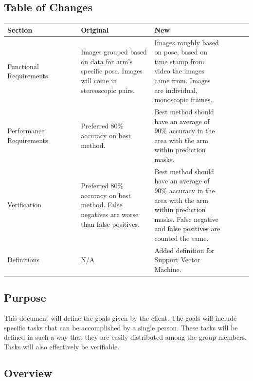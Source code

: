 \documentclass[10pt,journal,compsoc, draftclsnofoot,onecolumn]{IEEEtran}
\begin{document}
\subsection{Table of Changes}
\begin{center}
\begin{tabular}{|p{0.3\linewidth}|p{0.3\linewidth}|p{0.3\linewidth}|p{0.2\linewidth}|}
\hline
Section & Original & New \\ [0.5ex]
\hline\hline

Functional Requirements
&
Images grouped based on data for arm's specific pose.
Images will come in stereoscopic pairs.
&
Images roughly based on pose, based on time stamp from video the images came from.
Images are individual, monoscopic frames.
\\ \hline

Performance Requirements
&
Preferred 80\% accuracy on best method.
&
Best method should have an average of 90\% accuracy in the area with the arm within prediction masks.
\\ \hline

Verification
&
Preferred 80\% accuracy on best method.
False negatives are worse than false positives.
&
Best method should have an average of 90\% accuracy in the area with the arm within prediction masks.
False negative and false positives are counted the same.
\\ \hline

Definitions
&
N/A
&
Added definition for Support Vector Machine.
\\ \hline
\end{tabular}
\end{center}

\subsection{Purpose}
This document will define the goals given by the client.
The goals will include specific tasks that can be accomplished by a single person.
These tasks will be defined in such a way that they are easily distributed among the group members.
Tasks will also effectively be verifiable.

\subsection{Overview}
\end{document}
